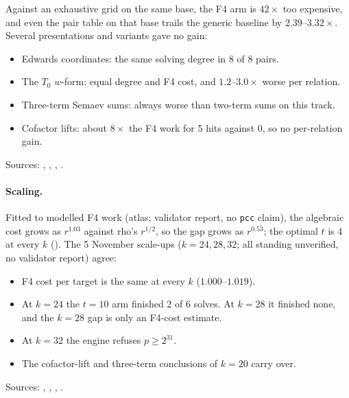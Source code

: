 Against an exhaustive grid on the same base, the F4 arm is $42\times$ too
expensive, and even the pair table on that base trails the generic
baseline by $2.39$--$3.32\times$. Several presentations and variants gave
no gain:
\begin{itemize}
\item Edwards coordinates: the same solving degree in 8 of 8 pairs.
\item The $T_0$ $w$-form: equal degree and F4 cost, and $1.2$--$3.0\times$
  worse per relation.
\item Three-term Semaev sums: always worse than two-term sums on this
  track.
\item Cofactor lifts: about $8\times$ the F4 work for 5 hits against 0,
  so no per-relation gain.
\end{itemize}
Sources: ,
,
,
.

\paragraph{Scaling.} Fitted to modelled F4 work (atlas; validator report,
no \texttt{pcc} claim), the algebraic cost grows as
$r^{1.03}$ against rho's $r^{1/2}$, so the gap grows as $r^{0.53}$; the
optimal $t$ is 4 at every $k$ ().
The 5 November scale-ups ($k=24,28,32$; all standing unverified, no
validator report) agree:
\begin{itemize}
\item F4 cost per target is the same at every $k$ ($1.000$--$1.019$).
\item At $k=24$ the $t=10$ arm finished 2 of 6 solves. At $k=28$ it
  finished none, and the $k=28$ gap is only an F4-cost estimate.
\item At $k=32$ the engine refuses $p\ge2^{31}$.
\item The cofactor-lift and three-term conclusions of $k=20$ carry over.
\end{itemize}
Sources: ,
,
,
.

